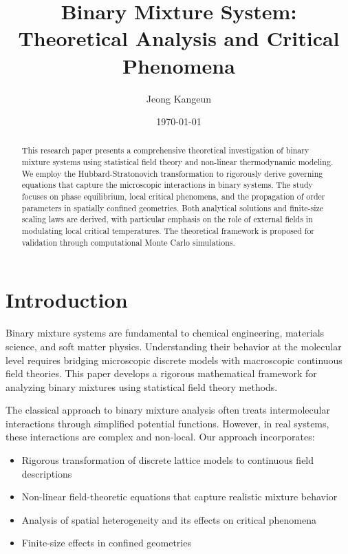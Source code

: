 \documentclass[12pt,a4paper]{article}
\title{Binary Mixture System: Theoretical Analysis and Critical Phenomena}
\author{Jeong Kangeun}
\date{\today}
\begin{document}
\maketitle

\begin{abstract}
This research paper presents a comprehensive theoretical investigation of binary mixture systems using statistical field theory and non-linear thermodynamic modeling. We employ the Hubbard-Stratonovich transformation to rigorously derive governing equations that capture the microscopic interactions in binary systems. The study focuses on phase equilibrium, local critical phenomena, and the propagation of order parameters in spatially confined geometries. Both analytical solutions and finite-size scaling laws are derived, with particular emphasis on the role of external fields in modulating local critical temperatures. The theoretical framework is proposed for validation through computational Monte Carlo simulations.
\end{abstract}

\section{Introduction}

Binary mixture systems are fundamental to chemical engineering, materials science, and soft matter physics. Understanding their behavior at the molecular level requires bridging microscopic discrete models with macroscopic continuous field theories. This paper develops a rigorous mathematical framework for analyzing binary mixtures using statistical field theory methods.

The classical approach to binary mixture analysis often treats intermolecular interactions through simplified potential functions. However, in real systems, these interactions are complex and non-local. Our approach incorporates:

\begin{itemize}
    \item Rigorous transformation of discrete lattice models to continuous field descriptions
    \item Non-linear field-theoretic equations that capture realistic mixture behavior
    \item Analysis of spatial heterogeneity and its effects on critical phenomena
    \item Finite-size effects in confined geometries
\end{itemize}
\end{document}
